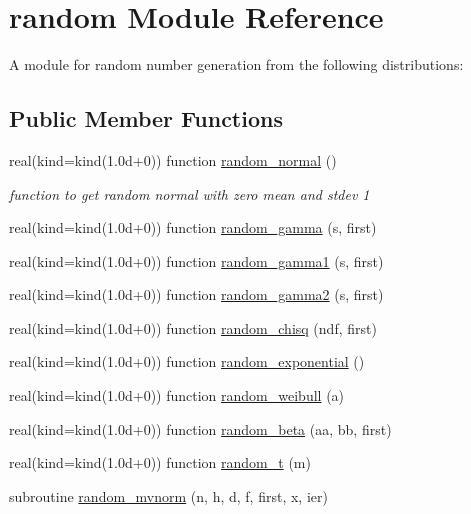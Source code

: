 \hypertarget{classrandom}{\section{random Module Reference}
\label{classrandom}
}


A module for random number generation from the following distributions\-:  


\subsection*{Public Member Functions}
\begin{DoxyCompactItemize}
\item 
real(kind=kind(1.\-0d+0)) function \hyperlink{classrandom_a05c493f12b4a3acad4d42bf23e3bf23a}{random\-\_\-normal} ()
\begin{DoxyCompactList}\small\item\em function to get random normal with zero mean and stdev 1 \end{DoxyCompactList}\item 
real(kind=kind(1.\-0d+0)) function \hyperlink{classrandom_a0ffe848e8b744d46f54c64489374cadf}{random\-\_\-gamma} (s, first)
\item 
real(kind=kind(1.\-0d+0)) function \hyperlink{classrandom_a7f62d97723dd55391a86b2875b8f67b1}{random\-\_\-gamma1} (s, first)
\item 
real(kind=kind(1.\-0d+0)) function \hyperlink{classrandom_a6c16fa1e3c755b37dc43212078c6af18}{random\-\_\-gamma2} (s, first)
\item 
real(kind=kind(1.\-0d+0)) function \hyperlink{classrandom_ac6329ddadc01dc01d991971b5d955727}{random\-\_\-chisq} (ndf, first)
\item 
real(kind=kind(1.\-0d+0)) function \hyperlink{classrandom_a14421c1b908f2263d65da068fddfc7dd}{random\-\_\-exponential} ()
\item 
real(kind=kind(1.\-0d+0)) function \hyperlink{classrandom_ab847036d4dbe5c63613425d28a395275}{random\-\_\-weibull} (a)
\item 
real(kind=kind(1.\-0d+0)) function \hyperlink{classrandom_a0037b9f6838b023c794c2addf89f9ba1}{random\-\_\-beta} (aa, bb, first)
\item 
real(kind=kind(1.\-0d+0)) function \hyperlink{classrandom_a52f7096c93579e684fd894e01bedcd4d}{random\-\_\-t} (m)
\item 
subroutine \hyperlink{classrandom_a2770bb736479f52377a6f9eea473da8e}{random\-\_\-mvnorm} (n, h, d, f, first, x, ier)

\end{DoxyCompactItemize}
